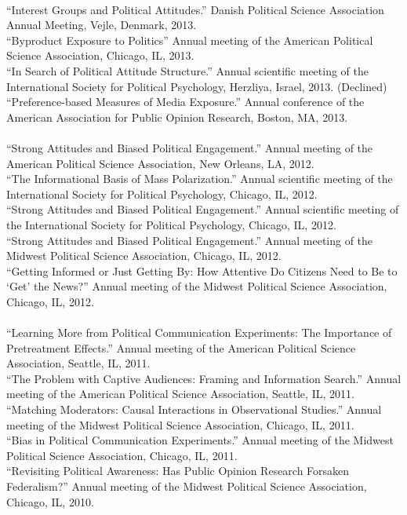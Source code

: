 \documentclass[12pt]{article}
\newcommand{\topic}[1]{\pagebreak[3]\indent {\color{lg}{\footnotesize #1 }}\\}
\newcommand{\entry}[1]{\indent {\color{lg}\guillemotright}\hspace{2pt}#1\vspace{.25em}\\}
\begin{document}
	\topic{Conference Papers (2013)}
	\entry{``Interest Groups and Political Attitudes.'' Danish Political Science Association Annual Meeting, Vejle, Denmark, 2013.}
	\entry{``Byproduct Exposure to Politics'' Annual meeting of the American Political Science Association, Chicago, IL, 2013.}
	\entry{``In Search of Political Attitude Structure.'' Annual scientific meeting of the International Society for Political Psychology, Herzliya, Israel, 2013. (Declined)}
	\entry{``Preference-based Measures of Media Exposure.'' Annual conference of the American Association for Public Opinion Research, Boston, MA, 2013.}
	
	\topic{Conference Papers (2012)}
	\entry{``Strong Attitudes and Biased Political Engagement.'' Annual meeting of the American Political Science Association, New Orleans, LA, 2012.}
	\entry{``The Informational Basis of Mass Polarization.'' Annual scientific meeting of the International Society for Political Psychology, Chicago, IL, 2012.}
	\entry{``Strong Attitudes and Biased Political Engagement.'' Annual scientific meeting of the International Society for Political Psychology, Chicago, IL, 2012.}
	\entry{``Strong Attitudes and Biased Political Engagement.'' Annual meeting of the Midwest Political Science Association, Chicago, IL, 2012.}
	\entry{``Getting Informed or Just Getting By: How Attentive Do Citizens Need to Be to `Get' the News?'' Annual meeting of the Midwest Political Science Association, Chicago, IL, 2012.}
	
	\topic{Conference Papers (2011 and earlier)}
	\entry{``Learning More from Political Communication Experiments: The Importance of Pretreatment Effects.'' Annual meeting of the American Political Science Association, Seattle, IL, 2011.}
	\entry{``The Problem with Captive Audiences: Framing and Information Search.'' Annual meeting of the American Political Science Association, Seattle, IL, 2011.}
	\entry{``Matching Moderators: Causal Interactions in Observational Studies.'' Annual meeting of the Midwest Political Science Association, Chicago, IL, 2011.}
	\entry{``Bias in Political Communication Experiments.'' Annual meeting of the Midwest Political Science Association, Chicago, IL, 2011.}
	\entry{``Revisiting Political Awareness: Has Public Opinion Research Forsaken Federalism?'' Annual meeting of the Midwest Political Science Association, Chicago, IL, 2010.}
\end{document}
